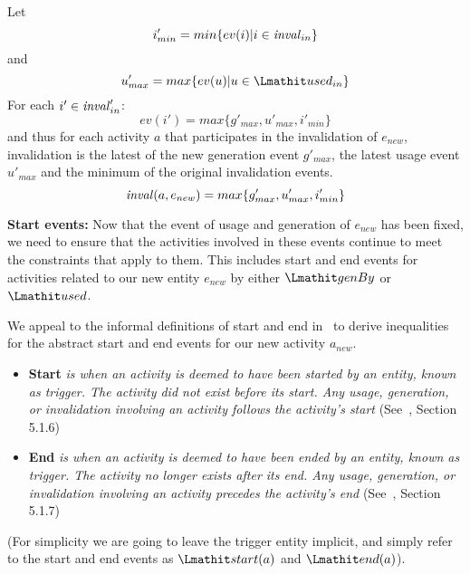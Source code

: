 \vspace*{10pt}
\begin{definition} 
\label{def:abstract-inv}
Let
\[i'_{min} = min \{ ev(i) | i \in \mathit{inval}_{in} \}\]
and 
\[u'_{max} = max \{ ev(u) | u \in \used_{in} \}\]
For each $i' \in \mathit{inval}'_{in}$:
\[
ev(i') = max \{ g'_{max} , u'_{max},  i'_{min}\}
\]
and thus for each activity $a$  that participates in the invalidation of $e_{new}$, invalidation is the latest of the new generation event $g'_{max}$, the latest usage event $u'_{max}$ and the minimum of the original invalidation events.  
\begin{equation}
\mathit{inval}(a,e_{new}) = max \{ g'_{max} , u'_{max},  i'_{min} \}
\end{equation}
\end{definition}


{\bf Start events:} Now that the event of usage and generation of $e_{new}$ has been fixed, we need to ensure that the activities involved in these events continue to meet the constraints that apply to them. This includes start and end events for activities related to our new entity $e_{new}$ by either $\wgby$ or $\used$.  


We appeal to the informal definitions of start and end in~\citep{w3c-prov-dm} to derive inequalities for the abstract start and end events for our new activity $a_{new}$.
% 
\begin{itemize}
\item \textbf{Start} \textit{is when an activity is deemed to have been started by an entity, known as trigger. The activity did not exist before its start. Any usage, generation, or invalidation involving an activity follows the activity's start} (See~\citep{w3c-prov-dm},  Section 5.1.6)

\item \textbf{End} \textit{is when an activity is deemed to have been ended by an entity, known as trigger. The activity no longer exists after its end. Any usage, generation, or invalidation involving an activity precedes the activity's end} (See~\citep{w3c-prov-dm}, Section 5.1.7)
\end{itemize}
(For simplicity we are going to leave the trigger entity implicit, and simply refer to the start and end events as $\start(a)$ and $\ed(a)$).


